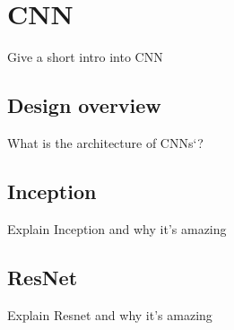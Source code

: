 \chapter{CNN}

Give a short intro into CNN

\section{Design overview}

What is the architecture of CNNs`?

\section{Inception}

Explain Inception and why it's amazing

\section{ResNet}

Explain Resnet and why it's amazing
